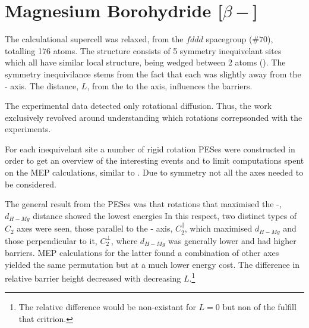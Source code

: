 \section{Magnesium Borohydride [$\beta-$]}
\label{sec:borohydrides-magnesium}


The calculational supercell was relaxed, from the $fddd$ spacegroup ($\#70$), totalling 176 atoms.
The structure consists of 5 symmetry inequivelant  sites which all have similar local structure, being wedged between 2  atoms ().
The symmetry inequivilance stems from the fact that each  was slightly away from the - axis.
The distance, $L$, from the  to the axis, influences the barriers.

The experimental data detected only rotational diffusion.
Thus, the work exclusively revolved around understanding which rotations correpsonded with the experiments.

For each inequivelant site a number of rigid rotation PESes were constructed in order to get an overview of the interesting events and to limit computations spent on the MEP calculations, similar to .
Due to symmetry not all the axes needed to be considered.

The general result from the PESes was that rotations that maximised the -, $d_{H-Mg}$ distance showed the lowest energies 
In this respect, two distinct types of $C_2$ axes were seen, those parallel to the - axis, $C_2^\parallel$, which maximised $d_{H-Mg}$ and those perpendicular to it, $C_2^\perp$, where $d_{H-Mg}$ was generally lower and had higher barriers.
MEP calculations for the latter found a combination of other axes yielded the same permutation but at a much lower energy cost.
The difference in relative barrier height decreased with decreasing $L$.\footnote{The relative difference would be non-existant for $L=0$ but non of the  fulfill that critrion.}

